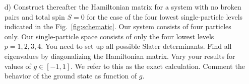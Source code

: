 \begin{prob}
\begin{enumerate}
  \item[d)] Construct thereafter the Hamiltonian matrix for a system
    with no broken pairs and total spin $S=0$ for the case of the four
    lowest single-particle levels indicated in the
    Fig.~\ref{fig:schematic}. Our system consists of four particles
    only.  Our single-particle space consists of only the four lowest
    levels $p=1,2,3,4$.  You need to set up all possible Slater
    determinants.  Find all eigenvalues by diagonalizing the
    Hamiltonian matrix.  Vary your results for values of $g\in
    [-1,1]$.  We refer to this as the exact calculation. Comment the
    behavior of the ground state as function of $g$.
  \end{enumerate}
  \end{prob}



